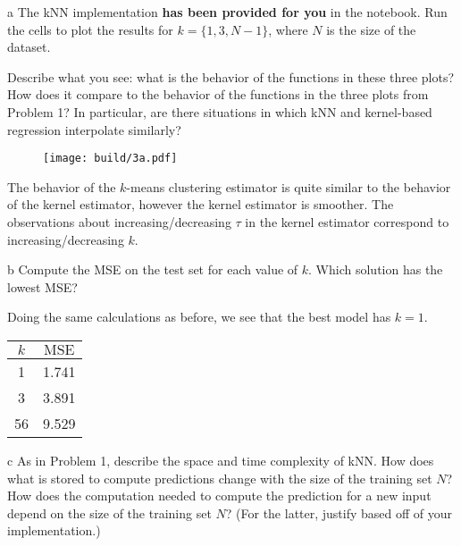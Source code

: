 \documentclass[expanded]{lkx_pset}
\begin{document}
\begin{parts}
  \begin{part}{a}
    The kNN implementation \textbf{has been provided for you} in the notebook. Run the cells to plot the results for $k=\{1, 3, N-1\}$, where $N$ is the size of the dataset.

    Describe what you see: what is the behavior of the functions in
    these three plots?  How does it compare to the behavior of the
    functions in the three plots from Problem 1? In particular, are
    there situations in which kNN and kernel-based regression
    interpolate similarly?
  \end{part}

  \begin{figure}[ht]
    \centering
    \texttt{[image: build/3a.pdf]}
  \end{figure}\noindent

  The behavior of the $k$-means clustering estimator is quite similar to the behavior of the kernel estimator, however the kernel estimator is smoother. The observations about increasing/decreasing $\tau$ in the kernel estimator correspond to increasing/decreasing $k$.

  \begin{part}{b}
    Compute the MSE on the test set for each value of $k$.  Which solution has the lowest MSE?  
  \end{part}

  Doing the same calculations as before, we see that the best model has $k=1$. 
  \begin{center}
    \renewcommand*{\arraystretch}{1.2}
    \begin{tabular}{|c|c|} 
     \hline
     $k$ & $\textrm{MSE}$ \\ 
     \hline
     1 & 1.741\\
     3 & 3.891\\
     56 & 9.529\\
     \hline
    \end{tabular}
  \end{center}

  \begin{part}{c}
    As in Problem 1, describe the space and time complexity of kNN.  How does what is stored to compute predictions change with the size of the training set $N$?  How does the computation needed to compute the prediction for a new input depend on the size of the training set $N$? (For the latter, justify based off of your implementation.)
  \end{part}


\end{parts}
\end{document}

